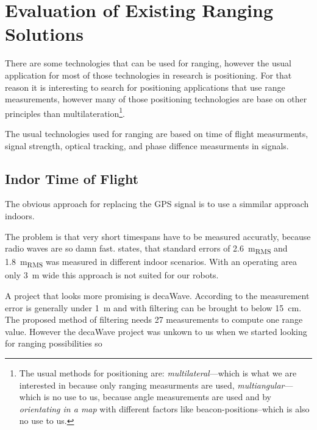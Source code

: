 \section{Evaluation of Existing Ranging Solutions}
There are some technologies that can be used for ranging, however the usual application for most of those technologies in research is positioning.
For that reason it is interesting to search for positioning applications that use range measurements, however many of those positioning technologies are base on other principles than multilateration\footnote{The usual methods for positioning are: \emph{multilateral}—which is what we are interested in because only ranging measurments are used, \emph{multiangular}—which is no use  to us, because angle measurements are used and by \emph{orientating in a map} with different factors like beacon-positions–which is also no use to us.}.
\cite{_multilateration_2015}

The usual technologies used for ranging are based on time of flight measurments, signal strength, optical tracking, and phase diffence measurments in signals.

\subsection{Indor Time of Flight}
The obvious approach for replacing the GPS signal is to use a simmilar approach indoors.

The problem is that very short timespans have to be measured accuratly, because radio waves are so damn fast. 
\cite{lanzisera2006} states, that standard errors of \SI{2.6}{\metre_{RMS}} and \SI{1.8}{\metre_{RMS}} was measured in different indoor scenarios.
With an operating area only \SI{3}{\metre} wide this approach is not suited for our robots.


A project that looks more promising is decaWave.
According to \cite{uwb_localisation_copter} the measurement error is generally under \SI{1}{\metre} and with filtering can be brought to below \SI{15}{\centi\metre}.
The proposed method of filtering needs 27 measurements to compute one range value.
However the decaWave project was unkown to us when we started looking for ranging possibilities so 

